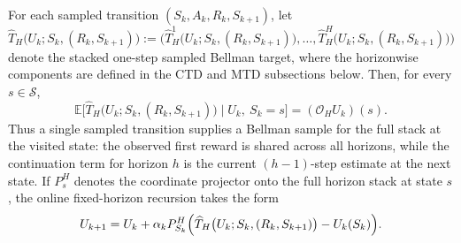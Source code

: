 \documentclass{article}
\newcommand{\X}{\mathcal{S}}
\begin{document}
For each sampled transition $(S_k,A_k,R_k,S_{k+1})$, let
\begin{equation}
\widehat T_H\bigl(U_k; S_k, (R_k,S_{k+1})\bigr) := \bigl(\widehat T_H^1\bigl(U_k; S_k, (R_k,S_{k+1})\bigr), \ldots, \widehat T_H^H\bigl(U_k; S_k, (R_k,S_{k+1})\bigr)\bigr)
\end{equation}
denote the stacked one-step sampled Bellman target, where the horizonwise components are defined in the CTD and MTD subsections below. Then, for every $s \in \X$,
\begin{equation}
\mathbb{E}\bigl[\widehat T_H\bigl(U_k; S_k, (R_k,S_{k+1})\bigr)\mid U_k,\ S_k = s \bigr] = (\mathcal O_H U_k)(s).
\end{equation}
Thus a single sampled transition supplies a Bellman sample for the full stack at the visited state: the observed first reward is shared across all horizons, while the continuation term for horizon $h$ is the current $(h-1)$-step estimate at the next state. If $P_s^H$ denotes the coordinate projector onto the full horizon stack at state $s$, the online fixed-horizon recursion takes the form
\begin{equation}\label{eq:undisc-recur}
U_{k+1} = U_k + \alpha_k P_{S_k}^H \Bigl(\widehat T_H\bigl(U_k; S_k, (R_k,S_{k+1})\bigr) - U_k(S_k) \Bigr).
\end{equation}
\end{document}
